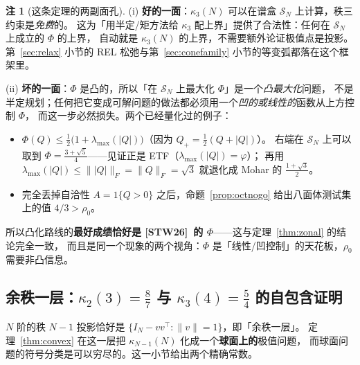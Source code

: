 \documentclass[UTF8,11pt]{ctexart}
\theoremstyle{definition}
\newtheorem{remark}[theorem]{注}
\newcommand{\STW}{\textup{[STW26]}}
\begin{document}
\begin{remark}[这条定理的两副面孔]\label{rmk:convexread}
(i) \textbf{好的一面}：$\kappa_3(N)$ 可以在谱盒 $\mathcal S_N$ 上计算，秩三约束是\emph{免费}的。
这为「用半定/矩方法给 $\kappa_3$ 配上界」提供了合法性：任何在 $\mathcal S_N$ 上成立的 $\Phi$ 的上界，
自动就是 $\kappa_3(N)$ 的上界，不需要额外论证极值点是投影。
第~\ref{sec:relax} 小节的 REL 松弛与第~\ref{sec:conefamily} 小节的等变弧都落在这个框架里。

(ii) \textbf{坏的一面}：$\Phi$ 是凸的，所以「在 $\mathcal S_N$ 上最大化 $\Phi$」是一个\emph{凸最大化}问题，
不是半定规划；任何把它变成可解问题的做法都必须用一个\emph{凹的或线性的}函数从上方控制 $\Phi$，
而这一步必然损失。两个已经量化过的例子：
\begin{itemize}
\item $\Phi(Q)\le\frac12\bigl(1+\lambda_{\max}(|Q|)\bigr)$（因为 $Q_+=\frac12(Q+|Q|)$）。
右端在 $\mathcal S_N$ 上可以取到 $\Phi=\frac{3+\sqrt5}4$——见证正是 ETF（$\lambda_{\max}(|Q|)=\varphi$）；
再用 $\lambda_{\max}(|Q|)\le\||Q|\|_F=\|Q\|_F=\sqrt3$ 就退化成 Mohar 的 $\frac{1+\sqrt3}2$。
\item 完全丢掉自洽性 $A=1\{Q>0\}$ 之后，命题~\ref{prop:octnogo} 给出八面体测试集上的值 $4/3>\rho_0$。
\end{itemize}
所以凸化路线的\textbf{最好成绩恰好是 \STW\ 的 $\Phi$}——这与定理~\ref{thm:zonal} 的结论完全一致，
而且是同一个现象的两个视角：$\Phi$ 是「线性/凹控制」的天花板，$\rho_0$ 需要非凸信息。
\end{remark}

\subsection{余秩一层：$\kappa_2(3)=\frac87$ 与 $\kappa_3(4)=\frac54$ 的自包含证明}\label{sec:corank1}

$N$ 阶的秩 $N-1$ 投影恰好是 $\{I_N-vv^\top:\|v\|=1\}$，即「余秩一层」。
定理~\ref{thm:convex} 在这一层把 $\kappa_{N-1}(N)$ 化成一个\textbf{球面上的}极值问题，
而球面问题的符号分类是可以穷尽的。这一小节给出两个精确常数。
\end{document}

